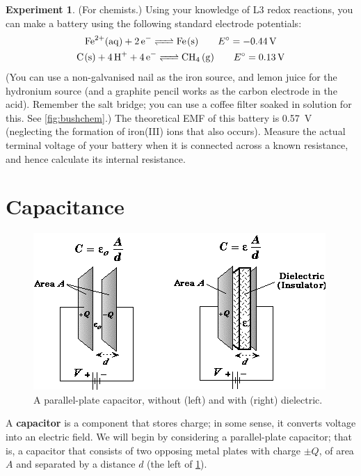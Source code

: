 \documentclass[a4paper]{amsbook}
\theoremstyle{definition}
\numberwithin{exercise}{chapter}
\numberwithin{exercise}{chapter}
\newtheorem{experiment}[exercise]{Experiment}
\begin{document}
\begin{experiment}
  (For chemists.) Using your knowledge of L3 redox reactions, you can make a battery using the following standard electrode potentials:
  \begin{gather}
    \ce{Fe^{2+}(aq) + 2e^- <=> Fe(s)} \qquad E^\circ = \SI{-0.44}{\volt}\\
    \ce{C(s) + 4H^+ + 4e^- <=> CH_4 (g)} \qquad E^\circ = \SI{+0.13}{\volt}
  \end{gather}
  (You can use a non-galvanised nail as the iron source, and lemon juice for the hydronium source (and a graphite pencil works as the carbon electrode in the
  acid). Remember the salt bridge; you can use a coffee filter soaked in  solution for this. See \cref{fig:bushchem}.) The theoretical EMF
  of this battery is \SI{0.57}{\volt} (neglecting the formation of iron(III) ions that also occurs). Measure the actual terminal voltage of your battery
  when it is connected across a known resistance, and hence calculate its internal resistance.
\end{experiment}

\section{Capacitance}
\begin{figure}
  \centering
  \includegraphics[width=\textwidth]{ppcapacitor}
  \caption{A parallel-plate capacitor, without (left) and with (right) dielectric.}\label{fig:ppcapacitor}
\end{figure}
A \textbf{capacitor} is a component that stores charge; in some sense, it converts voltage into an electric field. We will begin by considering
a parallel-plate capacitor; that is, a capacitor that consists of two opposing metal plates with charge $ \pm Q $, of area $ A $ and separated
by a distance $ d $ (the left of \cref{fig:ppcapacitor}).
\end{document}
